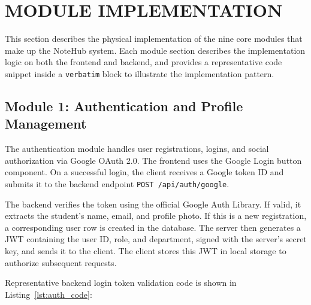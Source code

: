 \documentclass[12,Times new Roman,a4paper]{report}
\begin{document}
\newpage
\section{MODULE IMPLEMENTATION}

This section describes the physical implementation of the nine core modules that make up the NoteHub system. Each module section describes the implementation logic on both the frontend and backend, and provides a representative code snippet inside a \texttt{verbatim} block to illustrate the implementation pattern.

\subsection{Module 1: Authentication and Profile Management}

The authentication module handles user registrations, logins, and social authorization via Google OAuth 2.0. The frontend uses the Google Login button component. On a successful login, the client receives a Google token ID and submits it to the backend endpoint \texttt{POST /api/auth/google}. 

The backend verifies the token using the official Google Auth Library. If valid, it extracts the student's name, email, and profile photo. If this is a new registration, a corresponding user row is created in the database. The server then generates a JWT containing the user ID, role, and department, signed with the server's secret key, and sends it to the client. The client stores this JWT in local storage to authorize subsequent requests.

Representative backend login token validation code is shown in Listing~\ref{lst:auth_code}:
\end{document}
